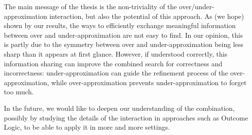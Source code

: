 The main message of the thesis is the non-triviality of the over/under-approximation interaction, but also the potential of this approach. As (we hope) shown by our results, the ways to efficiently exchange meaningful information between over and under-approximation are not easy to find. In our opinion, this is partly due to the symmetry between over and under-approximation being less sharp than it appears at first glance. However, if understood correctly, this information sharing can improve the combined search for correctness and incorrectness: under-approximation can guide the refinement process of the over-approximation, while over-approximation prevents under-approximation to forget too much.

In the future, we would like to deepen our understanding of the combination, possibly by studying the details of the interaction in approaches such as Outcome Logic, to be able to apply it in more and more settings.
